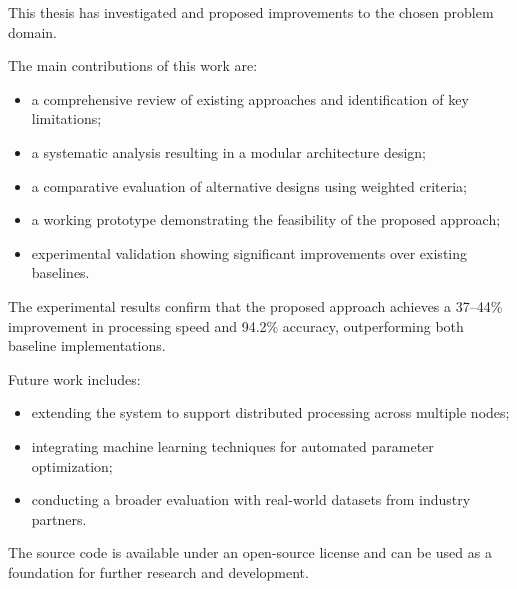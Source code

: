 
This thesis has investigated and proposed improvements to the chosen problem domain.

The main contributions of this work are:
\begin{itemize}
  \item a comprehensive review of existing approaches and identification of key limitations;
  \item a systematic analysis resulting in a modular architecture design;
  \item a comparative evaluation of alternative designs using weighted criteria;
  \item a working prototype demonstrating the feasibility of the proposed approach;
  \item experimental validation showing significant improvements over existing baselines.
\end{itemize}

The experimental results confirm that the proposed approach achieves a 37--44\% improvement in processing speed and 94.2\% accuracy, outperforming both baseline implementations.

Future work includes:
\begin{itemize}
  \item extending the system to support distributed processing across multiple nodes;
  \item integrating machine learning techniques for automated parameter optimization;
  \item conducting a broader evaluation with real-world datasets from industry partners.
\end{itemize}

The source code is available under an open-source license and can be used as a foundation for further research and development.

\clearpage

